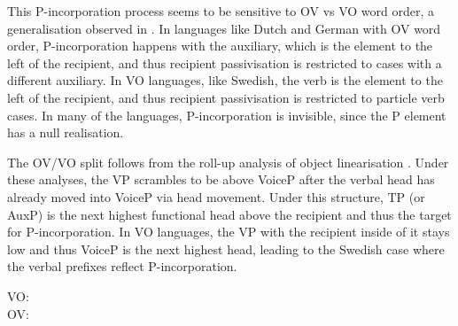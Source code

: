 This P-incorporation process seems to be sensitive to OV vs VO word order, a generalisation observed in \cite{Sprouse.1995}. In languages like Dutch and German with OV word order, P-incorporation happens with the auxiliary, which is the element to the left of the recipient, and thus recipient passivisation is restricted to cases with a different auxiliary. In VO languages, like Swedish, the verb is the element to the left of the recipient, and thus recipient passivisation is restricted to particle verb cases. In many of the languages, P-incorporation is invisible, since the P element has a null realisation.

The OV/VO split follows from the roll-up analysis of object linearisation \citep{Biberauer.2004,Biberauer.2005,Wallenberg.2009}. Under these analyses, the VP scrambles to be above VoiceP after the verbal head has already moved into VoiceP via head movement. Under this structure, TP (or AuxP) is the next highest functional head above the recipient and thus the target for P-incorporation. In VO languages, the VP with the recipient inside of it stays low and thus VoiceP is the next highest head, leading to the Swedish case where the verbal prefixes reflect P-incorporation.

\begin{exe}
	 VO:\\
	\ex OV:\\

\end{exe}


